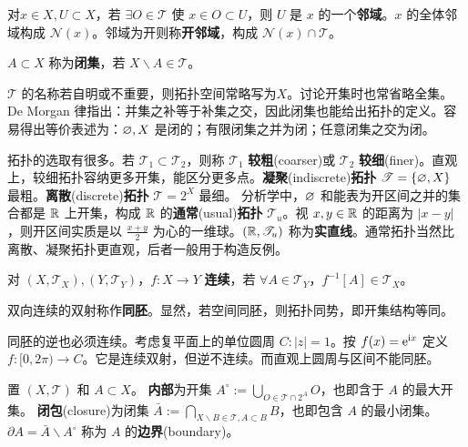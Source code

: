 \begin{definition}
    对$x\in X,U\subset X$，若 $\exists O\in\mathscr{T}$ 使 $x\in O\subset U$，则 $U$ 是 $x$ 的一个\textbf{邻域}。$x$ 的全体邻域构成 $\mathscr N(x)$。邻域为开则称\textbf{开邻域}，构成 $\mathscr N(x)\cap\mathscr T$。
\end{definition}

\begin{definition}
    $A\subset X$ 称为\textbf{闭集}，若 $X\backslash A\in\mathscr{T}$。
\end{definition}

$\mathscr T$ 的名称若自明或不重要，则拓扑空间常略写为$X$。讨论开集时也常省略全集。De Morgan 律指出：并集之补等于补集之交，因此闭集也能给出拓扑的定义。容易得出等价表述为：$\varnothing,X$ 是闭的；有限闭集之并为闭；任意闭集之交为闭。

拓扑的选取有很多。若 $\mathscr T_1\subset\mathscr T_2$，则称 $\mathscr T_1$ \textbf{较粗}(coarser)或 $\mathscr T_2$ \textbf{较细}(finer)。直观上，较细拓扑容纳更多开集，能区分更多点。\textbf{凝聚}(indiscrete)\textbf{拓扑} $\mathscr T=\{\varnothing,X\}$ 最粗。\textbf{离散}(discrete)\textbf{拓扑} $\mathscr T= 2^X$ 最细。
分析学中，$\varnothing$ 和能表为开区间之并的集合都是 $\mathbb{R}$ 上开集，构成 $\mathbb{R}$ 的\textbf{通常}(usual)\textbf{拓扑} $\mathscr T_u$。视 $x,y\in\mathbb{R}$ 的距离为 $|x-y|$，则开区间实质是以 $\frac{x+y}{2}$ 为心的一维球。$(\mathbb{R},\mathscr T_u)$ 称为\textbf{实直线}。通常拓扑当然比离散、凝聚拓扑更直观，后者一般用于构造反例。

\begin{definition}
    对 $(X,\mathscr T_X),(Y,\mathscr T_Y)$，$f: X \to Y$ \textbf{连续}，若 $\forall A\in\mathscr T_Y$，$f^{-1}[A]\in \mathscr T_X$。
\end{definition}

\begin{definition}
    双向连续的双射称作\textbf{同胚}。显然，若空间同胚，则拓扑同势，即开集结构等同。
\end{definition}

\begin{remark}
    同胚的逆也必须连续。考虑复平面上的单位圆周 $C:|z|=1$。按 $f(x)=\mathrm{e}^{\mathrm{i} x}$ 定义 $f:[0,2\pi)\to C$。它是连续双射，但逆不连续。而直观上圆周与区间不能同胚。
\end{remark}

\begin{definition}
置 $(X,\mathscr T)$ 和 $A\subset X$。
\textbf{内部}为开集 $A^\circ:=\bigcup_{O\in\mathscr T\cap 2^A} O$，也即含于 $A$ 的最大开集。
\textbf{闭包}(closure)为闭集 $\bar{A}:=\bigcap_{X\backslash B\in\mathscr T,A\subset B} B$，也即包含 $A$ 的最小闭集。
$\partial A=\bar{A}\backslash A^\circ$ 称为 $A$ 的\textbf{边界}(boundary)。
\end{definition}

